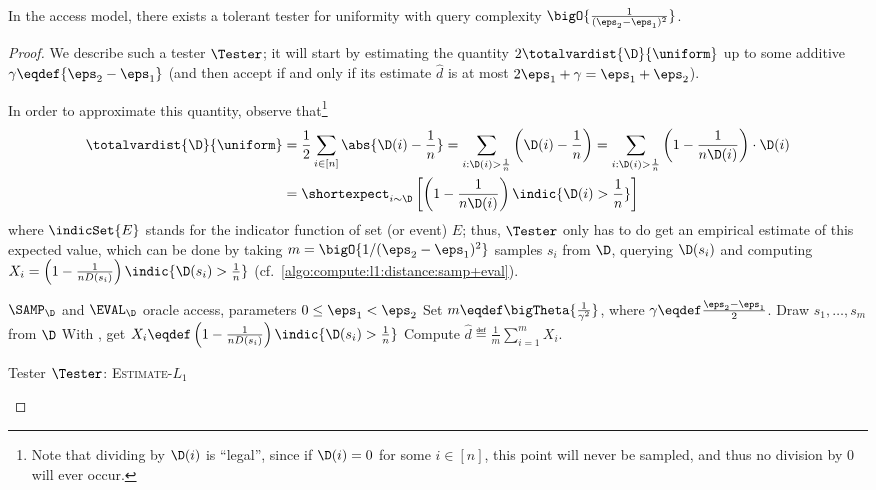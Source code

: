 \begin{theorem}\label{theorem:tolerant:tester:uniform}
In the \pdfsamp access model, there exists a tolerant tester for uniformity with query complexity $\bigO{\frac{1}{(\eps_2-\eps_1)^2}}$.
\end{theorem}
\begin{proof}
  We describe such a tester $\Tester$; it will start by estimating the quantity $2\totalvardist{\D}{\uniform}$ up to some additive $\gamma\eqdef{\eps_2-\eps_1}$ (and then accept if and only if its estimate $\hat{d}$ is at most $2\eps_1+\gamma = \eps_1+\eps_2$).
  
\noindent In order to approximate this quantity, observe that\footnote{Note that dividing by $\D(i)$ is ``legal'', since if $\D(i)=0$ for some $i\in[n]$, this point will never be sampled, and thus no division by $0$ will ever occur.}
  \begin{align}
  \totalvardist{\D}{\uniform} &= \frac{1}{2}\sum_{i\in[n]} \abs{\D(i)-\frac{1}{n}} = \sum_{i:\D(i)> \frac{1}{n} } \left(\D(i)-\frac{1}{n}\right) = \sum_{i:\D(i)> \frac{1}{n}} \left(1-\frac{1}{n\D(i)}\right)\cdot \D(i) \notag\\
  &= \shortexpect_{i\sim \D}\left[ \left(1 - \frac{1}{n\D(i)}\right)\indic{\D(i)> \frac{1}{n}} \right] \label{eq:trick:dtv:as:expectation}
  \end{align}
  where $\indicSet{E}$ stands for the indicator function of set (or event) $E$; thus, $\Tester$ only has to do get an empirical estimate of this expected value, which can be done by taking $m=\bigO{{1}/{(\eps_2-\eps_1)^2}}$ samples $s_i$ from $\D$, querying $\D(s_i)$ and computing $X_i = \left(1 - \frac{1}{nD(s_i)}\right)\indic{\D(s_i)> \frac{1}{n}}$ (cf.~\cref{algo:compute:l1:distance:samp+eval}).
  \begin{algorithm}[h!]
    \begin{algorithmic}
      \Require $\SAMP_{\D}$ and $\EVAL_{\D}$ oracle access, parameters $0\leq \eps_1 < \eps_2$
      \State Set $m\eqdef\bigTheta{\frac{1}{\gamma^2}}$, where $\gamma\eqdef\frac{\eps_2-\eps_1}{2}$.
      \State Draw $s_1,\dots,s_m$ from $\D$
        \State With \EVAL, get $X_i \eqdef \left(1 - \frac{1}{nD(s_i)}\right)\indic{\D(s_i)> \frac{1}{n}}$
      \EndFor
      \State Compute $\hat{d}\eqdef \frac{1}{m} \sum_{i=1}^m X_i$.
       \State \Return\accept  \Else \State \Return\reject \EndIf
    \end{algorithmic}
    \caption{\label{algo:compute:l1:distance:samp+eval}Tester $\Tester$: \textsc{Estimate-$L_1$} }
  \end{algorithm}


\end{proof}
